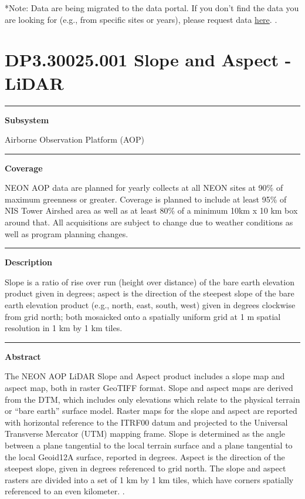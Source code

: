 \documentclass[]{article}
\begin{document}
*Note: Data are being migrated to the data portal. If you don't find the
data you are looking for (e.g., from specific sites or years), please
request data
\href{http://www.neonscience.org/request-airborne-data}{here}. \newpage
.

\section{DP3.30025.001 Slope and Aspect -
LiDAR}\label{dp3.30025.001-slope-and-aspect---lidar}

\begin{center}\rule{0.5\linewidth}{\linethickness}\end{center}

\textbf{Subsystem}

Airborne Observation Platform (AOP)

\begin{center}\rule{0.5\linewidth}{\linethickness}\end{center}

\textbf{Coverage}

NEON AOP data are planned for yearly collects at all NEON sites at 90\%
of maximum greenness or greater. Coverage is planned to include at least
95\% of NIS Tower Airshed area as well as at least 80\% of a minimum
10km x 10 km box around that. All acquisitions are subject to change due
to weather conditions as well as program planning changes.

\begin{center}\rule{0.5\linewidth}{\linethickness}\end{center}

\textbf{Description}

Slope is a ratio of rise over run (height over distance) of the bare
earth elevation product given in degrees; aspect is the direction of the
steepest slope of the bare earth elevation product (e.g., north, east,
south, west) given in degrees clockwise from grid north; both mosaicked
onto a spatially uniform grid at 1 m spatial resolution in 1 km by 1 km
tiles.

\begin{center}\rule{0.5\linewidth}{\linethickness}\end{center}

\textbf{Abstract}

The NEON AOP LiDAR Slope and Aspect product includes a slope map and
aspect map, both in raster GeoTIFF format. Slope and aspect maps are
derived from the DTM, which includes only elevations which relate to the
physical terrain or ``bare earth'' surface model. Raster maps for the
slope and aspect are reported with horizontal reference to the ITRF00
datum and projected to the Universal Transverse Mercator (UTM) mapping
frame. Slope is determined as the angle between a plane tangential to
the local terrain surface and a plane tangential to the local Geoid12A
surface, reported in degrees. Aspect is the direction of the steepest
slope, given in degrees referenced to grid north. The slope and aspect
rasters are divided into a set of 1 km by 1 km tiles, which have corners
spatially referenced to an even kilometer. \newpage
.
\end{document}
